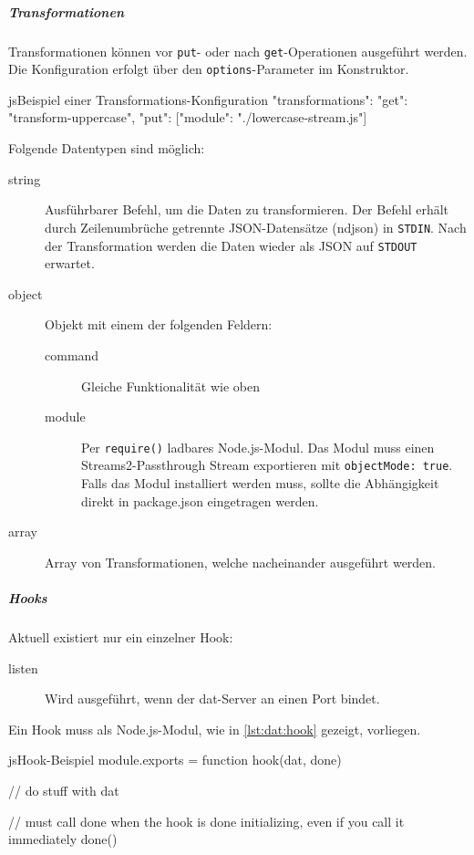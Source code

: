 \subparagraph{Transformationen}
Transformationen können vor \texttt{put}- oder nach \texttt{get}-Operationen ausgeführt werden. Die Konfiguration erfolgt über den \texttt{options}-Parameter im Konstruktor.

\begin{srclst}{js}{Beispiel einer Transformations-Konfiguration}
{
  "transformations": {
    "get": "transform-uppercase",
    "put": [{"module": "./lowercase-stream.js"}]
  }
}
\end{srclst}

Folgende Datentypen sind möglich:
\begin{description}
\item[string] Ausführbarer Befehl, um die Daten zu transformieren. Der Befehl erhält durch Zeilenumbrüche getrennte JSON-Datensätze (\acs{ndjson}) in \texttt{STDIN}. Nach der Transformation werden die Daten wieder als JSON auf \texttt{STDOUT} erwartet.
\item[object] Objekt mit einem der folgenden Feldern:
    \begin{description}
    \item[command] Gleiche Funktionalität wie oben
    \item[module] Per \texttt{require()} ladbares Node.js-Modul. Das Modul muss einen Streams2-Passthrough Stream exportieren mit \texttt{objectMode: true}. Falls das Modul installiert werden muss, sollte die Abhängigkeit direkt in package.json eingetragen werden.
    \end{description}
\item[array] Array von Transformationen, welche nacheinander ausgeführt werden.
\end{description}

\subparagraph{Hooks}
Aktuell existiert nur ein einzelner Hook:
\begin{description}
\item[listen] Wird ausgeführt, wenn der dat-Server an einen Port bindet.
\end{description}

Ein Hook muss als Node.js-Modul, wie in \cref{lst:dat:hook} gezeigt, vorliegen.

\begin{srclst}[label=lst:dat:hook]{js}{Hook-Beispiel}
module.exports = function hook(dat, done) {
  // do stuff with dat

  // must call done when the hook is done initializing, even if you call it immediately
  done()
}
\end{srclst}

